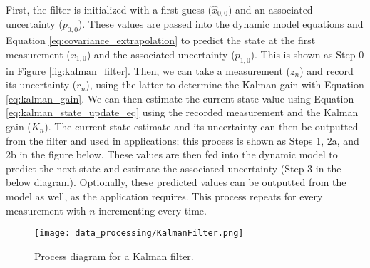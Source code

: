         First, the filter is initialized with a first guess ($\hat{x}_{0,0}$) and an associated uncertainty ($p_{0,0}$).
        These values are passed into the dynamic model equations and Equation \ref{eq:covariance_extrapolation} to predict the state at the first measurement ($x_{1,0}$) and the associated uncertainty ($p_{1,0}$).
        This is shown as Step 0 in Figure \ref{fig:kalman_filter}.
        Then, we can take a measurement ($z_n$) and record its uncertainty ($r_n$), using the latter to determine the Kalman gain with Equation \ref{eq:kalman_gain}.
        We can then estimate the current state value using Equation \ref{eq:kalman_state_update_eq} using the recorded measurement and the Kalman gain ($K_n$).
        The current state estimate and its uncertainty can then be outputted from the filter and used in applications; this process is shown as Steps 1, 2a, and 2b in the figure below.
        These values are then fed into the dynamic model to predict the next state and estimate the associated uncertainty (Step 3 in the below diagram).
        Optionally, these predicted values can be outputted from the model as well, as the application requires.
        This process repeats for every measurement with $n$ incrementing every time.

        \begin{figure*}[h!]
            \texttt{[image: data\_processing/KalmanFilter.png]}
            \caption[Kalman Filter Diagram]{Process diagram for a Kalman filter.}
        \end{figure*}



